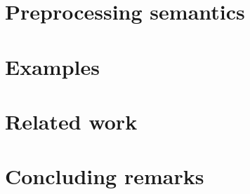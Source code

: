 \documentclass{article}
\begin{document}



\section{Preprocessing semantics}

\section{Examples}

\section{Related work}

\section{Concluding remarks}


%
%
 
\end{document}
